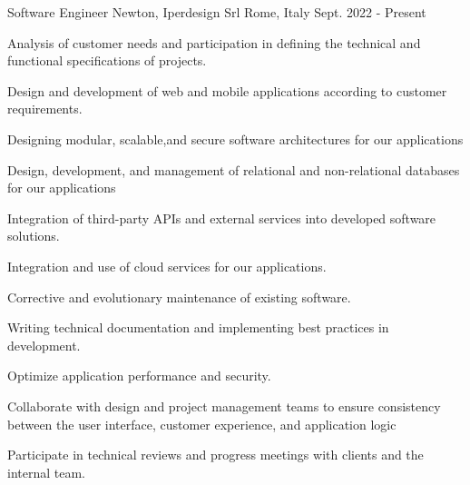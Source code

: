 

\begin{cventries}

  \cventry
    {Software Engineer} %
    {Newton, Iperdesign Srl} %
    {Rome, Italy} %
    {Sept. 2022 - Present} %
    {
      \begin{cvitems} %
        \item {Analysis of customer needs and participation in defining the technical and functional specifications of projects.}
        \item {Design and development of web and mobile applications according to customer requirements.}
        \item {Designing modular, scalable,and secure software architectures for our applications}
        \item {Design, development, and management of relational and non-relational databases for our applications}
        \item {Integration of third-party APIs and external services into developed software solutions.}
        \item {Integration and use of cloud services for our applications.}
        \item {Corrective and evolutionary maintenance of existing software.}
        \item {Writing technical documentation and implementing best practices in development.}
        \item {Optimize application performance and security.}
        \item {Collaborate with design and project management teams to ensure consistency between the user interface, customer experience, and application logic}
        \item {Participate in technical reviews and progress meetings with clients and the internal team.}
      \end{cvitems}
    }


\end{cventries}
